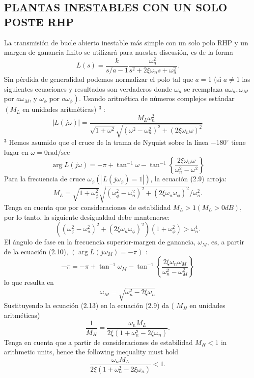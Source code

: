 \subsection{PLANTAS INESTABLES CON UN SOLO POSTE RHP}
La transmisión de bucle abierto inestable más simple con un solo polo RHP y un margen de ganancia finito se utilizará para nuestra discusión, es de la forma
$$
L(s)=\frac{k}{s / a-1} \frac{\omega_{n}^{2}}{s^{2}+2 \xi \omega_{n} s+\omega_{n}^{2}} .
$$
Sin pérdida de generalidad podemos normalizar el polo tal que $a=1$ (si $a \neq 1$ las siguientes ecuaciones y resultados son verdaderos donde $\omega_{n}$ se reemplaza $a \omega_{n}, \omega_{M}$ por $a \omega_{M}$, y $\omega_{\phi}$ por $\left.a \omega_{\phi}\right)$. Usando aritmética de números complejos estándar $\left(M_{L}\right.$ en unidades aritméticas) ${ }^{3}$ :
$$
| L(j \omega)|=\frac{M_{L} \omega_{n}^{2}}{\sqrt{1+\omega^{2}} \sqrt{\left(\omega^{2}-\omega_{n}^{2}\right)^{2}+\left(2 \xi \omega_{n} \omega\right)^{2}}}
$$
${ }^{3}$ Hemos asumido que el cruce de la trama de Nyquist sobre la línea $-180^{\circ}$ tiene lugar en $\omega=0 \mathrm{rad} / \mathrm{sec}$
$$
\arg L(j \omega)=-\pi+\tan ^{-1} \omega-\tan ^{-1}\left\{\frac{2 \xi \omega_{n} \omega}{\omega_{n}^{2}-\omega^{2}}\right\}
$$
Para la frecuencia de cruce $\omega_{\phi}\left(\left| L\left(j \omega_{\phi}\right)=1\right|\right)$, la ecuación (2.9) arroja:
$$
M_{L}=\sqrt{1+\omega_{\phi}^{2}} \sqrt{\left(\omega_{\phi}^{2}-\omega_{n}^{2}\right)^{2}+\left(2 \xi \omega_{n} \omega_{\phi}\right)^{2}} / \omega_{n}^{2} .
$$
Tenga en cuenta que por consideraciones de estabilidad $M_{L}>1\left(M_{L}>0 d B\right)$, por lo tanto, la siguiente desigualdad debe mantenerse:
$$
\left(\left(\omega_{\phi}^{2}-\omega_{n}^{2}\right)^{2}+\left(2 \xi \omega_{n} \omega_{\phi}\right)^{2}\right)\left(1+\omega_{\phi}^{2}\right)>\omega_{n}^{4} .
$$
El ángulo de fase en la frecuencia superior-margen de ganancia, $\omega_{M}$, es, a partir de la ecuación (2.10), $\left(\arg L\left(j \omega_{M}\right)=-\pi\right)$ :
$$
-\pi=-\pi+\tan ^{-1} \omega_{M}-\tan ^{-1}\left\{\frac{2 \xi \omega_{n} \omega_{M}}{\omega_{n}^{2}-\omega_{M}^{2}}\right\}
$$
lo que resulta en
$$
\omega_{M}=\sqrt{\omega_{n}^{2}-2 \xi \omega_{n}}
$$
Sustituyendo la ecuación (2.13) en la ecuación (2.9) da ( $M_{H}$ en unidades aritméticas)
$$
\frac{1}{M_{H}}=\frac{\omega_{n} M_{L}}{2 \xi\left(1+\omega_{n}^{2}-2 \xi \omega_{n}\right)} .
$$
Tenga en cuenta que a partir de consideraciones de estabilidad $M_{H}<1$ in arithmetic units, hence the following inequality must hold
$$
\frac{\omega_{n} M_{L}}{2 \xi\left(1+\omega_{n}^{2}-2 \xi \omega_{n}\right)}<1 .
$$
